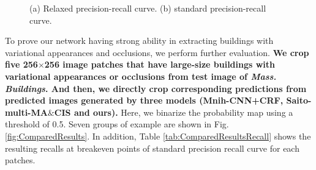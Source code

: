 \documentclass[runningheads]{llncs}
\begin{document}
\begin{figure}
\centering
{}
\caption{(a) Relaxed precision-recall curve. (b) standard precision-recall curve.}
\label{fig:}
\end{figure}
 
  To prove our network having strong ability in extracting buildings with variational appearances and occlusions, we perform  further evaluation. \textbf{We crop five 256$\times$256 image patches that have large-size buildings with variational appearances or occlusions from test image of \textit{Mass. Buildings}. And then, we directly crop corresponding predictions from predicted images  generated by three models (Mnih-CNN+CRF\cite{Mnih2013Machine}, Saito-multi-MA$\&$CIS\cite{Saito2016Multiple} and ours).} Here, we binarize the probability map using a threshold of 0.5. Seven groups of example are shown in Fig. \ref{fig:ComparedResults}. In addition, Table \ref{tab:ComparedResultsRecall} shows the resulting recalls at breakeven points of standard precision recall curve for each patches. 
  
\end{document}
